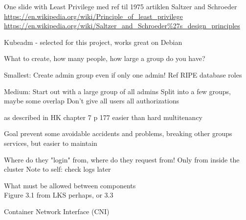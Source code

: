 \documentclass[Screen16to9,17pt]{foils}
\begin{document}
One slide with Least Privilege med ref til 1975 artiklen Saltzer and Schroeder\\
\url{https://en.wikipedia.org/wiki/Principle_of_least_privilege}\\
\url{https://en.wikipedia.org/wiki/Saltzer_and_Schroeder%27s_design_principles}

Kubeadm - selected for this project, works great on Debian


\begin{list2}
\item
\end{list2}


\begin{list2}
\item
\end{list2}
What to create, how many people, how large a group do you have?

Smallest:
Create admin group even if only one admin! Ref RIPE database roles

Medium:
Start out with a large group of all admins
Split into a few groups, maybe some overlap
Don't give all users all authorizations


\begin{list2}
\item
\end{list2}
as described in HK chapter 7 p 177
easier than hard multitenancy

Goal prevent some avoidable accidents and problems, breaking other groups services, but easier to maintain



\begin{list2}
\item
\end{list2}
Where do they "login" from, where do they request from! Only from inside the cluster
Note to self: check logs later


\begin{list2}
\item What must be allowed between components\\
Figure 3.1 from LKS perhaps, or 3.3
\end{list2}

\begin{list2}
\item
Container Network Interface (CNI)
\end{list2}
\end{document}
